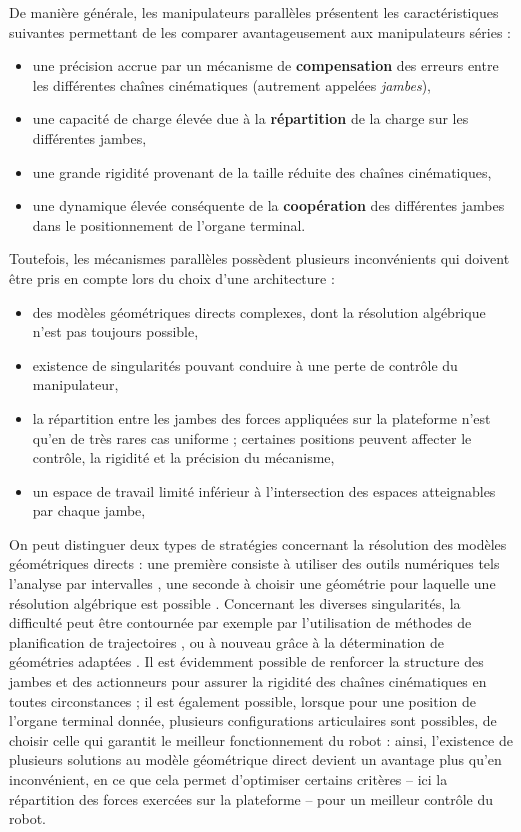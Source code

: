 De manière générale, les manipulateurs parallèles présentent les caractéristi\-ques sui\-vantes permettant de les comparer avantageusement aux manipulateurs séries :
\begin{itemize}
 \item une précision accrue par un mécanisme de {\bf compensation} des erreurs entre les différentes chaînes cinématiques (autrement appelées {\it jambes}),
 \item une capacité de charge élevée due à la {\bf répartition} de la charge sur les différentes jambes,
 \item une grande rigidité provenant de la taille réduite des chaînes cinématiques,
 \item une dynamique élevée conséquente de la {\bf coopération} des différentes jam\-bes dans le positionnement de l'organe terminal.
\end{itemize}

Toutefois, les mécanismes parallèles possèdent plusieurs inconvénients qui doivent être pris en compte lors du choix d'une architecture :
\begin{itemize}
 \item des modèles géométriques directs complexes, dont la résolution algébrique n'est pas toujours possible,
 \item existence de singularités pouvant conduire à une perte de contrôle du manipulateur,
 \item la répartition entre les jambes des forces appliquées sur la plateforme n'est qu'en de très rares cas uniforme ; certaines positions peuvent affecter le contrôle, la rigidité et la précision du mécanisme,
 \item un espace de travail limité inférieur à l'intersection des espaces atteignables par chaque jambe,
\end{itemize}

On peut distinguer deux types de stratégies concernant la résolution des modèles géométriques directs : une première consiste à utiliser des outils numé\-riques tels l'analyse par intervalles \cite{Merlet04solvingthe}, une seconde à choisir une géométrie pour laquelle une résolution algébrique est possible \cite{2003:Krut1}. Concernant les diverses singularités, la difficulté peut être contournée par exemple par l'utilisation de méthodes de planification de trajectoires \cite{2008:Chen.Chi}, \cite{1998:Dasgupta.Mruthyunjaya} ou à nouveau grâce à la détermination de géométries adaptées \cite{w1994:DiCaprioStanisic}. Il est évidemment possible de renforcer la structure des jambes et des actionneurs pour assurer la rigidité des chaînes cinématiques en toutes circonstances ; il est également possible, lorsque pour une position de l'organe terminal donnée, plusieurs configurations articulaires sont possibles, de choisir celle qui garantit le meilleur fonctionnement du robot \cite{2002:Verhoeven.Miller} : ainsi, l'existence de plusieurs solutions au modèle géométrique direct devient un avantage plus qu'en inconvénient, en ce que cela permet d'optimiser certains critères -- ici la répartition des forces exercées sur la plateforme -- pour un meilleur contrôle du robot.

